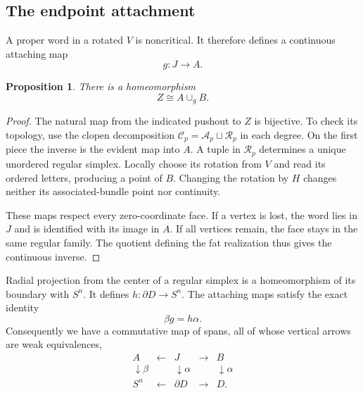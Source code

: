 \documentclass[11pt,a4paper]{article}
\newtheorem{proposition}[theorem]{Proposition}
\theoremstyle{definition}
\newcommand{\Cconf}{\mathcal C}
\newcommand{\Aconf}{\mathcal A}
\newcommand{\Rconf}{\mathcal R}
\begin{document}
\subsection{The endpoint attachment}
A proper word in a rotated \(V\) is noncritical. It therefore defines a continuous attaching map
\[
g:J\longrightarrow A.
\]

\begin{proposition}\label{prop:pushout}
There is a homeomorphism
\[
Z\cong A\cup_g B.
\]
\end{proposition}
\begin{proof}
The natural map from the indicated pushout to \(Z\) is bijective. To check its topology, use the clopen decomposition
\(\Cconf_p=\Aconf_p\sqcup\Rconf_p\) in each degree.
On the first piece the inverse is the evident map into \(A\).
A tuple in \(\Rconf_p\) determines a unique unordered regular simplex. Locally choose its rotation from \(V\) and read its ordered letters, producing a point of \(B\). Changing the rotation by \(H\) changes neither its associated-bundle point nor continuity.

These maps respect every zero-coordinate face. If a vertex is lost, the word lies in \(J\) and is identified with its image in \(A\). If all vertices remain, the face stays in the same regular family. The quotient defining the fat realization thus gives the continuous inverse.
\end{proof}

Radial projection from the center of a regular simplex is a homeomorphism of its boundary with \(S^n\). It defines
\(h:\partial D\to S^n\).
The attaching maps satisfy the exact identity
\[
\beta g=h\alpha.
\]
Consequently we have a commutative map of spans, all of whose vertical arrows are weak equivalences,
\[
\begin{array}{ccccc}
A&\longleftarrow&J&\longrightarrow&B\\
\downarrow\beta&&\downarrow\alpha&&\downarrow\alpha\\
S^n&\longleftarrow&\partial D&\longrightarrow&D.
\end{array}
\]
\end{document}
